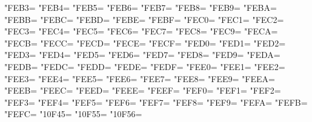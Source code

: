 \XeTeXcharclass"FEB3=\KclassArabU
\XeTeXcharclass"FEB4=\KclassArabU
\XeTeXcharclass"FEB5=\KclassArabU
\XeTeXcharclass"FEB6=\KclassArabU
\XeTeXcharclass"FEB7=\KclassArabU
\XeTeXcharclass"FEB8=\KclassArabU
\XeTeXcharclass"FEB9=\KclassArabU
\XeTeXcharclass"FEBA=\KclassArabU
\XeTeXcharclass"FEBB=\KclassArabU
\XeTeXcharclass"FEBC=\KclassArabU
\XeTeXcharclass"FEBD=\KclassArabU
\XeTeXcharclass"FEBE=\KclassArabU
\XeTeXcharclass"FEBF=\KclassArabU
\XeTeXcharclass"FEC0=\KclassArabU
\XeTeXcharclass"FEC1=\KclassArabU
\XeTeXcharclass"FEC2=\KclassArabU
\XeTeXcharclass"FEC3=\KclassArabU
\XeTeXcharclass"FEC4=\KclassArabU
\XeTeXcharclass"FEC5=\KclassArabU
\XeTeXcharclass"FEC6=\KclassArabU
\XeTeXcharclass"FEC7=\KclassArabU
\XeTeXcharclass"FEC8=\KclassArabU
\XeTeXcharclass"FEC9=\KclassArabU
\XeTeXcharclass"FECA=\KclassArabU
\XeTeXcharclass"FECB=\KclassArabU
\XeTeXcharclass"FECC=\KclassArabU
\XeTeXcharclass"FECD=\KclassArabU
\XeTeXcharclass"FECE=\KclassArabU
\XeTeXcharclass"FECF=\KclassArabU
\XeTeXcharclass"FED0=\KclassArabU
\XeTeXcharclass"FED1=\KclassArabU
\XeTeXcharclass"FED2=\KclassArabU
\XeTeXcharclass"FED3=\KclassArabU
\XeTeXcharclass"FED4=\KclassArabU
\XeTeXcharclass"FED5=\KclassArabU
\XeTeXcharclass"FED6=\KclassArabU
\XeTeXcharclass"FED7=\KclassArabU
\XeTeXcharclass"FED8=\KclassArabU
\XeTeXcharclass"FED9=\KclassArabU
\XeTeXcharclass"FEDA=\KclassArabU
\XeTeXcharclass"FEDB=\KclassArabU
\XeTeXcharclass"FEDC=\KclassArabU
\XeTeXcharclass"FEDD=\KclassArabU
\XeTeXcharclass"FEDE=\KclassArabU
\XeTeXcharclass"FEDF=\KclassArabU
\XeTeXcharclass"FEE0=\KclassArabU
\XeTeXcharclass"FEE1=\KclassArabU
\XeTeXcharclass"FEE2=\KclassArabU
\XeTeXcharclass"FEE3=\KclassArabU
\XeTeXcharclass"FEE4=\KclassArabU
\XeTeXcharclass"FEE5=\KclassArabU
\XeTeXcharclass"FEE6=\KclassArabU
\XeTeXcharclass"FEE7=\KclassArabU
\XeTeXcharclass"FEE8=\KclassArabU
\XeTeXcharclass"FEE9=\KclassArabU
\XeTeXcharclass"FEEA=\KclassArabU
\XeTeXcharclass"FEEB=\KclassArabU
\XeTeXcharclass"FEEC=\KclassArabU
\XeTeXcharclass"FEED=\KclassArabU
\XeTeXcharclass"FEEE=\KclassArabU
\XeTeXcharclass"FEEF=\KclassArabU
\XeTeXcharclass"FEF0=\KclassArabU
\XeTeXcharclass"FEF1=\KclassArabU
\XeTeXcharclass"FEF2=\KclassArabU
\XeTeXcharclass"FEF3=\KclassArabU
\XeTeXcharclass"FEF4=\KclassArabU
\XeTeXcharclass"FEF5=\KclassArabU
\XeTeXcharclass"FEF6=\KclassArabU
\XeTeXcharclass"FEF7=\KclassArabU
\XeTeXcharclass"FEF8=\KclassArabU
\XeTeXcharclass"FEF9=\KclassArabU
\XeTeXcharclass"FEFA=\KclassArabU
\XeTeXcharclass"FEFB=\KclassArabU
\XeTeXcharclass"FEFC=\KclassArabU
\XeTeXcharclass"10F45=\KclassArabU
\XeTeXcharclass"10F55=\KclassArabU
\XeTeXcharclass"10F56=\KclassArabU
